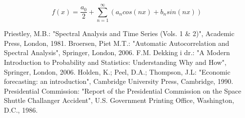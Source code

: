 \documentclass[a4paper,12pt,oneside]{memoir}
\newcommand{\fourierovred}{f(x)= \frac{a_0}{2}+\sum_{n=1}^\infty (a_n cos(nx)+b_n sin(nx))}
\begin{document}
        $$\fourierovred$$
    \begin{thebibliography}{9}
         Priestley, M.B.: "Spectral Analysis and Time Series (Vols. 1 \& 2)", Academic Press, London, 1981.
         Broersen, Piet M.T.: "Automatic Autocorrelation and Spectral Analysis", Springer, London, 2006.
         F.M. Dekking i dr.: "A Modern Introduction to Probability and Statistics: Understanding Why and How", Springer, London, 2006.
         Holden, K.; Peel, D.A.; Thompson, J.L: "Economic forecasting: an introduction", Cambridge University Press, Cambridge, 1990.
         Presidential Commission: "Report of the Presidential Commission on the Space Shuttle Challanger Accident", U.S. Government Printing Office, Washington, D.C., 1986.

    \end{thebibliography}
\end{document}
